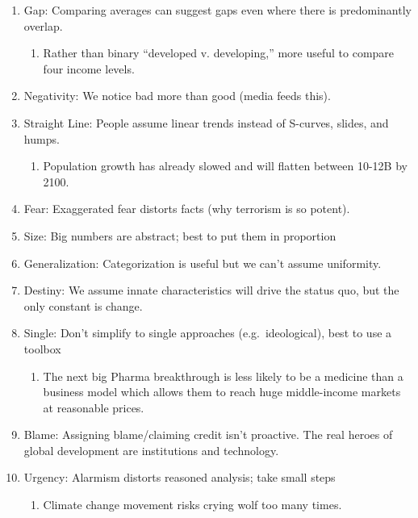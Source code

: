 \documentclass[
]{article}
\providecommand{\tightlist}{%
  \setlength{\itemsep}{0pt}\setlength{\parskip}{0pt}}
\begin{document}
\begin{enumerate}
\def\labelenumi{\arabic{enumi}.}
\item
  Gap: Comparing averages can suggest gaps even where there is
  predominantly overlap.

  \begin{enumerate}
  \def\labelenumii{\arabic{enumii}.}
  \tightlist
  \item
    Rather than binary ``developed v. developing,'' more useful to
    compare four income levels.
  \end{enumerate}
\item
  Negativity: We notice bad more than good (media feeds this).
\item
  Straight Line: People assume linear trends instead of S-curves,
  slides, and humps.

  \begin{enumerate}
  \def\labelenumii{\arabic{enumii}.}
  \setcounter{enumii}{1}
  \tightlist
  \item
    Population growth has already slowed and will flatten between 10-12B
    by 2100.
  \end{enumerate}
\item
  Fear: Exaggerated fear distorts facts (why terrorism is so potent).
\item
  Size: Big numbers are abstract; best to put them in proportion
\item
  Generalization: Categorization is useful but we can't assume
  uniformity.
\item
  Destiny: We assume innate characteristics will drive the status quo,
  but the only constant is change.
\item
  Single: Don't simplify to single approaches (e.g.~ideological), best
  to use a toolbox

  \begin{enumerate}
  \def\labelenumii{\arabic{enumii}.}
  \setcounter{enumii}{2}
  \tightlist
  \item
    The next big Pharma breakthrough is less likely to be a medicine
    than a business model which allows them to reach huge middle-income
    markets at reasonable prices.
  \end{enumerate}
\item
  Blame: Assigning blame/claiming credit isn't proactive. The real
  heroes of global development are institutions and technology.
\item
  Urgency: Alarmism distorts reasoned analysis; take small steps

  \begin{enumerate}
  \def\labelenumii{\arabic{enumii}.}
  \setcounter{enumii}{3}
  \tightlist
  \item
    Climate change movement risks crying wolf too many times.
  \end{enumerate}
\end{enumerate}
\end{document}
